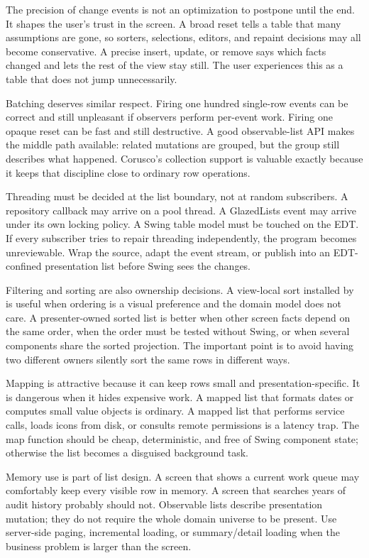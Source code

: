 The precision of change events is not an optimization to postpone until the end.
It shapes the user's trust in the screen. A broad reset tells a table that many
assumptions are gone, so sorters, selections, editors, and repaint decisions may
all become conservative. A precise insert, update, or remove says which facts
changed and lets the rest of the view stay still. The user experiences this as a
table that does not jump unnecessarily.

Batching deserves similar respect. Firing one hundred single-row events can be
correct and still unpleasant if observers perform per-event work. Firing one
opaque reset can be fast and still destructive. A good observable-list API makes
the middle path available: related mutations are grouped, but the group still
describes what happened. Corusco's collection support is valuable exactly
because it keeps that discipline close to ordinary row operations.

Threading must be decided at the list boundary, not at random subscribers. A
repository callback may arrive on a pool thread. A GlazedLists event may arrive
under its own locking policy. A Swing table model must be touched on the EDT.
If every subscriber tries to repair threading independently, the program becomes
unreviewable. Wrap the source, adapt the event stream, or publish into an
EDT-confined presentation list before Swing sees the changes.

Filtering and sorting are also ownership decisions. A view-local sort installed
by  is useful when ordering is a visual preference and the domain
model does not care. A presenter-owned sorted list is better when other screen
facts depend on the same order, when the order must be tested without Swing, or
when several components share the sorted projection. The important point is to
avoid having two different owners silently sort the same rows in different ways.

Mapping is attractive because it can keep rows small and presentation-specific.
It is dangerous when it hides expensive work. A mapped list that formats dates
or computes small value objects is ordinary. A mapped list that performs service
calls, loads icons from disk, or consults remote permissions is a latency trap.
The map function should be cheap, deterministic, and free of Swing component
state; otherwise the list becomes a disguised background task.

Memory use is part of list design. A screen that shows a current work queue may
comfortably keep every visible row in memory. A screen that searches years of
audit history probably should not. Observable lists describe presentation
mutation; they do not require the whole domain universe to be present. Use
server-side paging, incremental loading, or summary/detail loading when the
business problem is larger than the screen.

